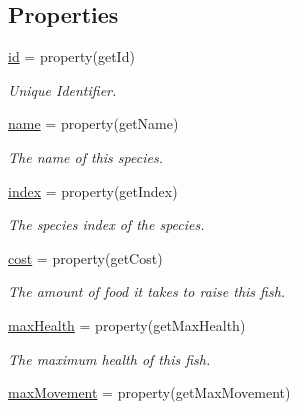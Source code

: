 \subsection*{\-Properties}
\begin{DoxyCompactItemize}
\item 
\hypertarget{classGameObject_1_1Species_ab7ea208e99fa0a2f8c24424f698f4f14}{\hyperlink{classGameObject_1_1Species_ab7ea208e99fa0a2f8c24424f698f4f14}{id} = property(get\-Id)}\label{classGameObject_1_1Species_ab7ea208e99fa0a2f8c24424f698f4f14}

\begin{DoxyCompactList}\small\item\em \-Unique \-Identifier. \end{DoxyCompactList}\item 
\hypertarget{classGameObject_1_1Species_a6937dae0064682691b39a4e91e41d73c}{\hyperlink{classGameObject_1_1Species_a6937dae0064682691b39a4e91e41d73c}{name} = property(get\-Name)}\label{classGameObject_1_1Species_a6937dae0064682691b39a4e91e41d73c}

\begin{DoxyCompactList}\small\item\em \-The name of this species. \end{DoxyCompactList}\item 
\hyperlink{classGameObject_1_1Species_a7d1a4a8cff66144687f4c45a57e941ab}{index} = property(get\-Index)
\begin{DoxyCompactList}\small\item\em \-The species index of the species. \end{DoxyCompactList}\item 
\hypertarget{classGameObject_1_1Species_ae12e68ab3b3d88c0992b2b8b0c479320}{\hyperlink{classGameObject_1_1Species_ae12e68ab3b3d88c0992b2b8b0c479320}{cost} = property(get\-Cost)}\label{classGameObject_1_1Species_ae12e68ab3b3d88c0992b2b8b0c479320}

\begin{DoxyCompactList}\small\item\em \-The amount of food it takes to raise this fish. \end{DoxyCompactList}\item 
\hypertarget{classGameObject_1_1Species_af1c130e0af73738c8e3eb073555e4127}{\hyperlink{classGameObject_1_1Species_af1c130e0af73738c8e3eb073555e4127}{max\-Health} = property(get\-Max\-Health)}\label{classGameObject_1_1Species_af1c130e0af73738c8e3eb073555e4127}

\begin{DoxyCompactList}\small\item\em \-The maximum health of this fish. \end{DoxyCompactList}\item 
\hypertarget{classGameObject_1_1Species_abbc323ee50cbbc01cf82b0badd45ff44}{\hyperlink{classGameObject_1_1Species_abbc323ee50cbbc01cf82b0badd45ff44}{max\-Movement} = property(get\-Max\-Movement)}\label{classGameObject_1_1Species_abbc323ee50cbbc01cf82b0badd45ff44}


\end{DoxyCompactItemize}

